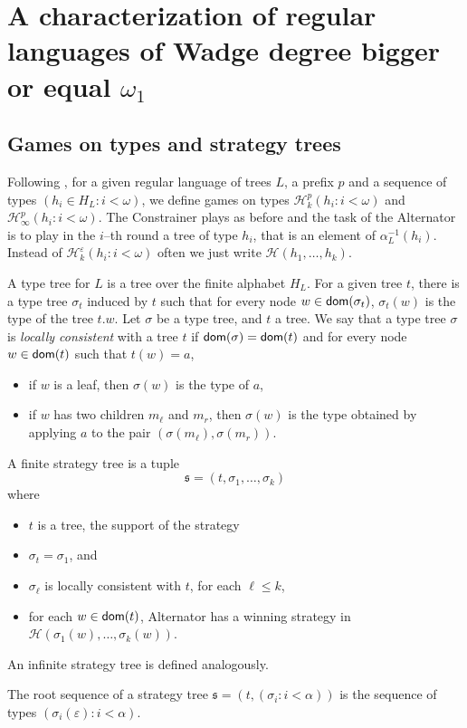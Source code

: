 
\section{A characterization of regular languages of Wadge degree bigger or equal $\omega_1$}
\subsection{Games on types and strategy trees}
Following \cite{bp}, for a given regular language of trees $L$, a prefix $p$ and a sequence of types $(h_i\in H_L : i <\omega)$, we define games on types $\mathcal{H}^p_k(h_i : i < \omega)$ and $\mathcal{H}^p_\infty(h_i : i < \omega)$. The Constrainer plays as before and the task of the Alternator is to play in the $i$--th round a tree of type $h_i$, that is an element of $\alpha_L^{-1}(h_i)$. Instead of $\mathcal{H}^\varepsilon_k(h_i : i < \omega)$ often we just write $\mathcal{H}(h_1, \dots, h_k)$.


A type tree for $L$ is a tree over the finite alphabet $H_L$. For a given tree $t$, there is a type tree $\sigma_t$ induced by $t$ such that for every node $w \in \mathsf{dom}(\sigma_t)$, $\sigma_t(w)$ is the type of the tree $t.w$.
Let $\sigma$ be a type tree, and $t$ a tree. We say that a type tree $\sigma$ is \emph{locally consistent} with a tree $t$ if $\mathsf{dom}(\sigma)=\mathsf{dom}(t)$ and for every node $w \in \mathsf{dom}(t)$ such that $t(w)=a$, 
\begin{itemize}
\item if $w$ is a leaf, then $\sigma(w)$ is the type of $a$,
\item if $w$ has two children $m_\ell$ and $m_r$, then $\sigma(w)$ is the type obtained by applying $a$ to the pair $(\sigma(m_\ell), \sigma(m_r))$.
\end{itemize}

\begin{definition} A finite strategy tree is a tuple
\[ \mathfrak{s}=(t, \sigma_1, \dots, \sigma_k) \] where
\begin{itemize}
\item $t$ is a tree, the support of the strategy
\item $\sigma_t=\sigma_1$, and
\item $\sigma_\ell$ is locally consistent with $t$, for each $\ell \leq k$,
\item for each $w \in \mathsf{dom}(t)$, Alternator has a winning strategy in $\mathcal{H}(\sigma_1(w), \dots, \sigma_k(w))$.
\end{itemize}
An  infinite strategy tree is defined analogously.
\end{definition}
The root sequence of a strategy tree $\mathfrak{s}=(t, (\sigma_i : i < \alpha))$ is the sequence of types $(\sigma_i(\varepsilon): i < \alpha)$.

